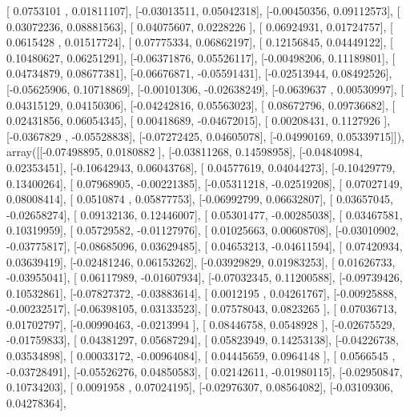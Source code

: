 \documentclass{article}
\begin{document}
       [ 0.0753101 ,  0.01811107],
       [-0.03013511,  0.05042318],
       [-0.00450356,  0.09112573],
       [ 0.03072236,  0.08881563],
       [ 0.04075607,  0.0228226 ],
       [ 0.06924931,  0.01724757],
       [ 0.0615428 ,  0.01517724],
       [ 0.07775334,  0.06862197],
       [ 0.12156845,  0.04449122],
       [ 0.10480627,  0.06251291],
       [-0.06371876,  0.05526117],
       [-0.00498206,  0.11189801],
       [ 0.04734879,  0.08677381],
       [-0.06676871, -0.05591431],
       [-0.02513944,  0.08492526],
       [-0.05625906,  0.10718869],
       [-0.00101306, -0.02638249],
       [-0.0639637 ,  0.00530997],
       [ 0.04315129,  0.04150306],
       [-0.04242816,  0.05563023],
       [ 0.08672796,  0.09736682],
       [ 0.02431856,  0.06054345],
       [ 0.00418689, -0.04672015],
       [ 0.00208431,  0.1127926 ],
       [-0.0367829 , -0.05528838],
       [-0.07272425,  0.04605078],
       [-0.04990169,  0.05339715]]), array([[-0.07498895,  0.0180882 ],
       [-0.03811268,  0.14598958],
       [-0.04840984,  0.02353451],
       [-0.10642943,  0.06043768],
       [ 0.04577619,  0.04044273],
       [-0.10429779,  0.13400264],
       [ 0.07968905, -0.00221385],
       [-0.05311218, -0.02519208],
       [ 0.07027149,  0.08008414],
       [ 0.0510874 ,  0.05877753],
       [-0.06992799,  0.06632807],
       [ 0.03657045, -0.02658274],
       [ 0.09132136,  0.12446007],
       [ 0.05301477, -0.00285038],
       [ 0.03467581,  0.10319959],
       [ 0.05729582, -0.01127976],
       [ 0.01025663,  0.00608708],
       [-0.03010902, -0.03775817],
       [-0.08685096,  0.03629485],
       [ 0.04653213, -0.04611594],
       [ 0.07420934,  0.03639419],
       [-0.02481246,  0.06153262],
       [-0.03929829,  0.01983253],
       [ 0.01626733, -0.03955041],
       [ 0.06117989, -0.01607934],
       [-0.07032345,  0.11200588],
       [-0.09739426,  0.10532861],
       [-0.07827372, -0.03883614],
       [ 0.0012195 ,  0.04261767],
       [-0.00925888, -0.00232517],
       [-0.06398105,  0.03133523],
       [ 0.07578043,  0.0823265 ],
       [ 0.07036713,  0.01702797],
       [-0.00990463, -0.0213994 ],
       [ 0.08446758,  0.0548928 ],
       [-0.02675529, -0.01759833],
       [ 0.04381297,  0.05687294],
       [ 0.05823949,  0.14253138],
       [-0.04226738,  0.03534898],
       [ 0.00033172, -0.00964084],
       [ 0.04445659,  0.0964148 ],
       [ 0.0566545 , -0.03728491],
       [-0.05526276,  0.04850583],
       [ 0.02142611, -0.01980115],
       [-0.02950847,  0.10734203],
       [ 0.0091958 ,  0.07024195],
       [-0.02976307,  0.08564082],
       [-0.03109306,  0.04278364],
\end{document}
